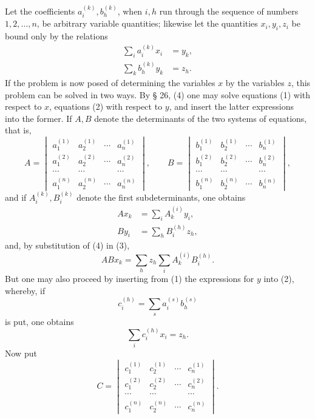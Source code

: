 \documentclass[11pt]{article}
\begin{document}
Let the coefficients $a_i^{(k)}, b_h^{(k)}$, when $i,h$ run through the sequence of numbers $1,2,\ldots,n$, be arbitrary variable quantities; likewise let the quantities $x_i,y_i,z_i$ be bound only by the relations
\begin{align}
 \sum_i a_i^{(k)}x_i&=y_k,\tag{1}\\
 \sum_k b_h^{(k)}y_k&=z_h.\tag{2}
\end{align}
If the problem is now posed of determining the variables $x$ by the variables $z$, this problem can be solved in two ways. By § 26, (4) one may solve equations (1) with respect to $x$, equations (2) with respect to $y$, and insert the latter expressions into the former. If $A,B$ denote the determinants of the two systems of equations, that is,
\[
A=\begin{vmatrix}
 a_1^{(1)}&a_2^{(1)}&\cdots&a_n^{(1)}\\
 a_1^{(2)}&a_2^{(2)}&\cdots&a_n^{(2)}\\
 \cdots&\cdots&&\cdots\\
 a_1^{(n)}&a_2^{(n)}&\cdots&a_n^{(n)}
\end{vmatrix},\qquad
B=\begin{vmatrix}
 b_1^{(1)}&b_2^{(1)}&\cdots&b_n^{(1)}\\
 b_1^{(2)}&b_2^{(2)}&\cdots&b_n^{(2)}\\
 \cdots&\cdots&&\cdots\\
 b_1^{(n)}&b_2^{(n)}&\cdots&b_n^{(n)}
\end{vmatrix},
\]
and if $A_i^{(k)},B_i^{(k)}$ denote the first subdeterminants, one obtains
\begin{align}
 A x_k&=\sum_i A_k^{(i)}y_i,\tag{3}\\
 B y_i&=\sum_h B_i^{(h)}z_h,\tag{4}
\end{align}
and, by substitution of (4) in (3),
\begin{equation}
 ABx_k=\sum_h z_h\sum_i A_k^{(i)}B_i^{(h)}.\tag{5}
\end{equation}
But one may also proceed by inserting from (1) the expressions for $y$ into (2), whereby, if
\begin{equation}
 c_i^{(h)}=\sum_s a_i^{(s)}b_h^{(s)}\tag{6}
\end{equation}
is put, one obtains
\begin{equation}
 \sum_i c_i^{(h)}x_i=z_h.\tag{7}
\end{equation}
Now put
\[
C=\begin{vmatrix}
 c_1^{(1)}&c_2^{(1)}&\cdots&c_n^{(1)}\\
 c_1^{(2)}&c_2^{(2)}&\cdots&c_n^{(2)}\\
 \cdots&\cdots&&\cdots\\
 c_1^{(n)}&c_2^{(n)}&\cdots&c_n^{(n)}
\end{vmatrix}.\tag{8}
\]
\end{document}
